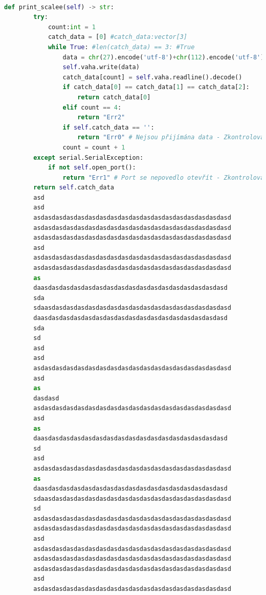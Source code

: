 \begin{lstlisting}[language=Python, caption=Funkce stavového automatu:, frame=single, breaklines=false, postbreak=\mbox{\textcolor{gray}{$\hookrightarrow$}\space}]

def print_scalee(self) -> str:
        try:
            count:int = 1
            catch_data = [0] #catch_data:vector[3]
            while True: #len(catch_data) == 3: #True
                data = chr(27).encode('utf-8')+chr(112).encode('utf-8')
                self.vaha.write(data)
                catch_data[count] = self.vaha.readline().decode()
                if catch_data[0] == catch_data[1] == catch_data[2]:
                    return catch_data[0]
                elif count == 4:
                    return "Err2"
                if self.catch_data == '':
                    return "Err0" # Nejsou přijímána data - Zkontrolovat připojení váhy
                count = count + 1
        except serial.SerialException:
            if not self.open_port():
                return "Err1" # Port se nepovedlo otevřít - Zkontrolovat připojení váhy
        return self.catch_data
        asd
        asd
        asdasdasdasdasdasdasdasdasdasdasdasdasdasdasdasdasdasd
        asdasdasdasdasdasdasdasdasdasdasdasdasdasdasdasdasdasd
        asdasdasdasdasdasdasdasdasdasdasdasdasdasdasdasdasdasd
        asd
        asdasdasdasdasdasdasdasdasdasdasdasdasdasdasdasdasdasd
        asdasdasdasdasdasdasdasdasdasdasdasdasdasdasdasdasdasd
        as
        daasdasdasdasdasdasdasdasdasdasdasdasdasdasdasdasdasd
        sda
        sdaasdasdasdasdasdasdasdasdasdasdasdasdasdasdasdasdasd
        daasdasdasdasdasdasdasdasdasdasdasdasdasdasdasdasdasd
        sda
        sd
        asd
        asd
        asdasdasdasdasdasdasdasdasdasdasdasdasdasdasdasdasdasd
        asd
        as
        dasdasd
        asdasdasdasdasdasdasdasdasdasdasdasdasdasdasdasdasdasd
        asd
        as
        daasdasdasdasdasdasdasdasdasdasdasdasdasdasdasdasdasd
        sd
        asd
        asdasdasdasdasdasdasdasdasdasdasdasdasdasdasdasdasdasd
        as
        daasdasdasdasdasdasdasdasdasdasdasdasdasdasdasdasdasd
        sdaasdasdasdasdasdasdasdasdasdasdasdasdasdasdasdasdasd
        sd
        asdasdasdasdasdasdasdasdasdasdasdasdasdasdasdasdasdasd
        asdasdasdasdasdasdasdasdasdasdasdasdasdasdasdasdasdasd
        asd
        asdasdasdasdasdasdasdasdasdasdasdasdasdasdasdasdasdasd
        asdasdasdasdasdasdasdasdasdasdasdasdasdasdasdasdasdasd
        asdasdasdasdasdasdasdasdasdasdasdasdasdasdasdasdasdasd
        asd
        asdasdasdasdasdasdasdasdasdasdasdasdasdasdasdasdasdasd

\end{lstlisting}
